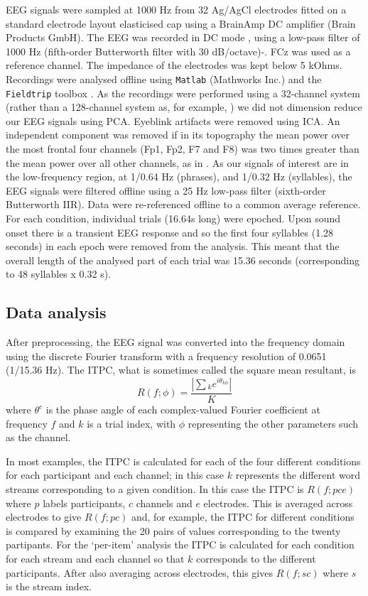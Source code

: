 \documentclass[10pt,letterpaper]{article}
\newcommand{\citet}[1]{\cite{#1}}
\begin{document}
EEG signals were sampled at 1000 Hz from 32 Ag/AgCl electrodes fitted
on a standard electrode layout elasticised cap using a BrainAmp DC
amplifier (Brain Products GmbH). The EEG was recorded in DC mode ,
using a low-pass filter of 1000 Hz (fifth-order Butterworth filter
with 30 dB/octave)-. FCz was used as a reference channel. The
impedance of the electrodes was kept below 5 kOhms. Recordings were
analysed offline using \texttt{Matlab} (Mathworks Inc.) and the
\texttt{Fieldtrip} toolbox \cite{FieldTrip}. As the recordings were
performed using a 32-channel system (rather than a 128-channel system
as, for example, \citet{DingEtAl2017}) we did not dimension reduce our
EEG signals using PCA. Eyeblink artifacts were removed using ICA. An
independent component was removed if in its topography the mean power
over the most frontal four channels (Fp1, Fp2, F7 and F8) was two
times greater than the mean power over all other channels, as in
\citet{DingEtAl2017}. As our signals of interest are in the
low-frequency region, at 1/0.64 Hz (phrases), and 1/0.32 Hz
(syllables), the EEG signals were filtered offline using a 25 Hz
low-pass filter (sixth-order Butterworth IIR). Data were re-referenced
offline to a common average reference. For each condition, individual
trials (16.64s long) were epoched. Upon sound onset there is a
transient EEG response and so the first four syllables (1.28 seconds)
in each epoch were removed from the analysis. This meant that the
overall length of the analysed part of each trial was 15.36 seconds
(corresponding to 48 syllables x 0.32 s).

\subsection*{Data analysis}

After preprocessing, the EEG signal was converted into the frequency
domain using the discrete Fourier transform with a frequency
resolution of 0.0651 (1/15.36 Hz). The ITPC, what is sometimes called
the square mean resultant, is
\begin{equation}
\label{eq:itpc}
R(f;\phi)=\frac{\left|\sum{_k} e^{i\theta_{k\phi}}\right|}{K}
\end{equation}
where $\theta^c$ is the phase angle of each complex-valued Fourier
coefficient at frequency $f$ and $k$ is a trial index, with $\phi$
representing the other parameters such as the channel.

In most examples, the ITPC is calculated for each of the four
different conditions for each participant and each channel; in this
case $k$ represents the different word streams corresponding to a
given condition. In this case the ITPC is $R(f;pce)$ where $p$ labels
participants, $c$ channels and $e$ electrodes. This is averaged across
electrodes to give $R(f;pc)$ and, for example, the ITPC for different
conditions is compared by examining the 20 pairs of values
corresponding to the twenty partipants. For the `per-item' analysis
the ITPC is calculated for each condition for each stream and each
channel so that $k$ corresponds to the different participants. After
also averaging across electrodes, this gives $R(f;sc)$ where $s$ is
the stream index.
\end{document}

